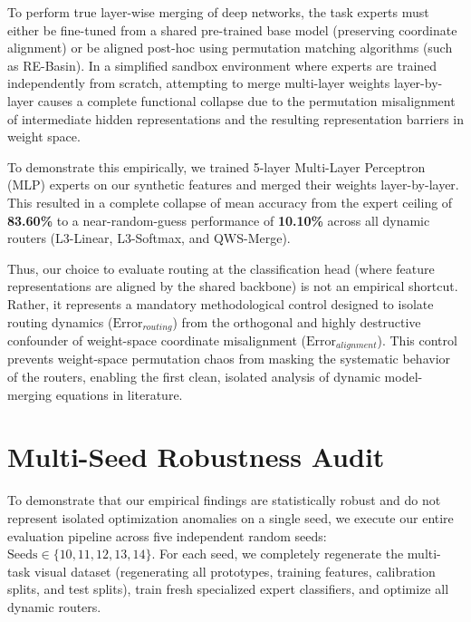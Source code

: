 To perform true layer-wise merging of deep networks, the task experts must either be fine-tuned from a shared pre-trained base model (preserving coordinate alignment) or be aligned post-hoc using permutation matching algorithms (such as RE-Basin). In a simplified sandbox environment where experts are trained independently from scratch, attempting to merge multi-layer weights layer-by-layer causes a complete functional collapse due to the permutation misalignment of intermediate hidden representations and the resulting representation barriers in weight space. 

To demonstrate this empirically, we trained 5-layer Multi-Layer Perceptron (MLP) experts on our synthetic features and merged their weights layer-by-layer. This resulted in a complete collapse of mean accuracy from the expert ceiling of \textbf{83.60\%} to a near-random-guess performance of \textbf{10.10\%} across all dynamic routers (L3-Linear, L3-Softmax, and QWS-Merge). 

Thus, our choice to evaluate routing at the classification head (where feature representations are aligned by the shared backbone) is not an empirical shortcut. Rather, it represents a mandatory methodological control designed to isolate routing dynamics ($\text{Error}_{routing}$) from the orthogonal and highly destructive confounder of weight-space coordinate misalignment ($\text{Error}_{alignment}$). This control prevents weight-space permutation chaos from masking the systematic behavior of the routers, enabling the first clean, isolated analysis of dynamic model-merging equations in literature.

\section{Multi-Seed Robustness Audit}
\label{sec:seed_audit_app}
To demonstrate that our empirical findings are statistically robust and do not represent isolated optimization anomalies on a single seed, we execute our entire evaluation pipeline across five independent random seeds: $\text{Seeds} \in \{10, 11, 12, 13, 14\}$. For each seed, we completely regenerate the multi-task visual dataset (regenerating all prototypes, training features, calibration splits, and test splits), train fresh specialized expert classifiers, and optimize all dynamic routers.

